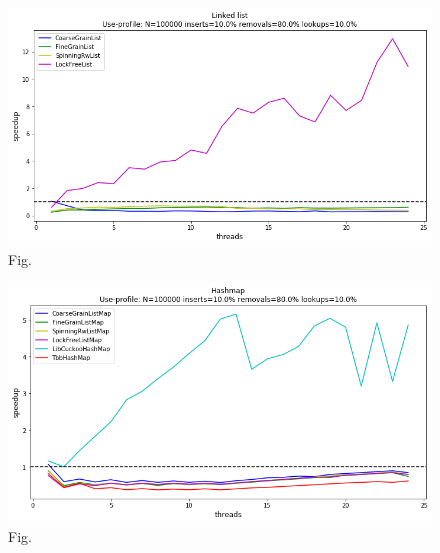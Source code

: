 \documentclass[11pt]{article}
\begin{document}
\begin{figure}[h]
\centering
\includegraphics[width=1.0\linewidth]{figs/lateday/combined/lateday_combined_list_insert_10_lookup_10_removal_80}
\caption{Fig.}
\label{fig:fig1}
\end{figure}

\begin{figure}[h]
\centering
\includegraphics[width=0.5\linewidth]{figs/lateday/combined/lateday_combined_map_insert_10_lookup_10_removal_80}
\caption{Fig.}
\label{fig:fig2}
\end{figure}

\printbibliography
\end{document}
